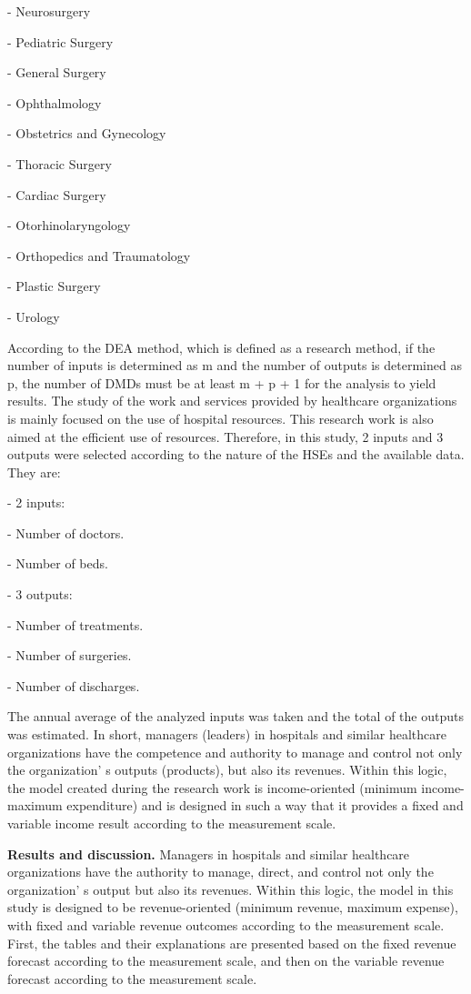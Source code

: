 \begin{multicols}{2}
- Neurosurgery

- Pediatric Surgery

- General Surgery

- Ophthalmology

- Obstetrics and Gynecology

- Thoracic Surgery

- Cardiac Surgery

- Otorhinolaryngology

- Orthopedics and Traumatology

- Plastic Surgery

- Urology

According to the DEA method, which is defined as a research method, if
the number of inputs is determined as m and the number of outputs is
determined as p, the number of DMDs must be at least m + p + 1 for the
analysis to yield results. The study of the work and services provided
by healthcare organizations is mainly focused on the use of hospital
resources. This research work is also aimed at the efficient use of
resources. Therefore, in this study, 2 inputs and 3 outputs were
selected according to the nature of the HSEs and the available data.
They are:

- 2 inputs:

- Number of doctors.

- Number of beds.

- 3 outputs:

- Number of treatments.

- Number of surgeries.

- Number of discharges.

The annual average of the analyzed inputs was taken and the total of the
outputs was estimated. In short, managers (leaders) in hospitals and
similar healthcare organizations have the competence and authority to
manage and control not only the organization' s outputs
(products), but also its revenues. Within this logic, the model created
during the research work is income-oriented (minimum income-maximum
expenditure) and is designed in such a way that it provides a fixed and
variable income result according to the measurement scale.

{\bfseries Results and discussion.} Managers in hospitals and similar
healthcare organizations have the authority to manage, direct, and
control not only the organization' s output but also its
revenues. Within this logic, the model in this study is designed to be
revenue-oriented (minimum revenue, maximum expense), with fixed and
variable revenue outcomes according to the measurement scale. First, the
tables and their explanations are presented based on the fixed revenue
forecast according to the measurement scale, and then on the variable
revenue forecast according to the measurement scale.
\end{multicols}

